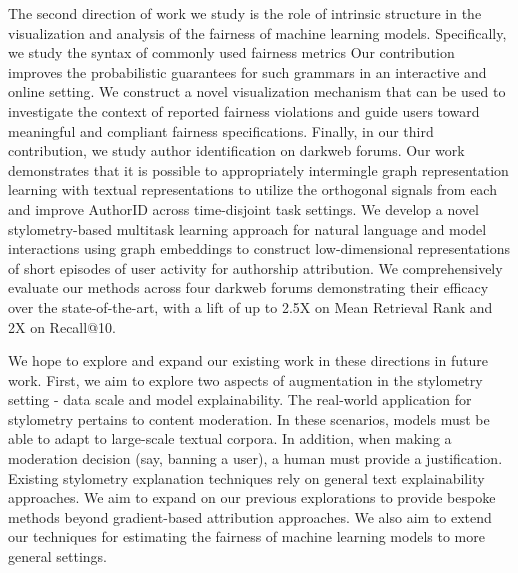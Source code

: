 The second direction of work we study is the role of intrinsic structure in the visualization and analysis of the fairness of machine learning models.
Specifically, we study the syntax of commonly used fairness metrics 
Our contribution improves the probabilistic guarantees for such grammars in an interactive and online setting.
We construct a novel visualization mechanism that can be used to investigate the context of reported fairness violations and guide users toward meaningful and compliant fairness specifications.
Finally, in our third contribution, we study author identification on darkweb forums.
Our work demonstrates that it is possible to appropriately intermingle graph representation learning with textual representations to utilize the orthogonal signals from each and improve AuthorID across time-disjoint task settings.
We develop a novel stylometry-based multitask learning approach for natural language and model interactions using graph embeddings to construct low-dimensional representations of short episodes of user activity for authorship attribution. 
We comprehensively evaluate our methods across four darkweb forums demonstrating their efficacy over the state-of-the-art, with a lift of up to 2.5X on Mean Retrieval Rank and 2X on Recall@10.


We hope to explore and expand our existing work in these directions in future work. 
First, we aim to explore two aspects of augmentation in the stylometry setting - data scale and model explainability. 
The real-world application for stylometry pertains to content moderation. 
In these scenarios, models must be able to adapt to large-scale textual corpora.
In addition, when making a moderation decision (say, banning a user), a human must provide a justification.
Existing stylometry explanation techniques rely on general text explainability approaches. 
We aim to expand on our previous explorations to provide bespoke methods beyond gradient-based attribution approaches.
We also aim to extend our techniques for estimating the fairness of machine learning models to more general settings.
\endinput
